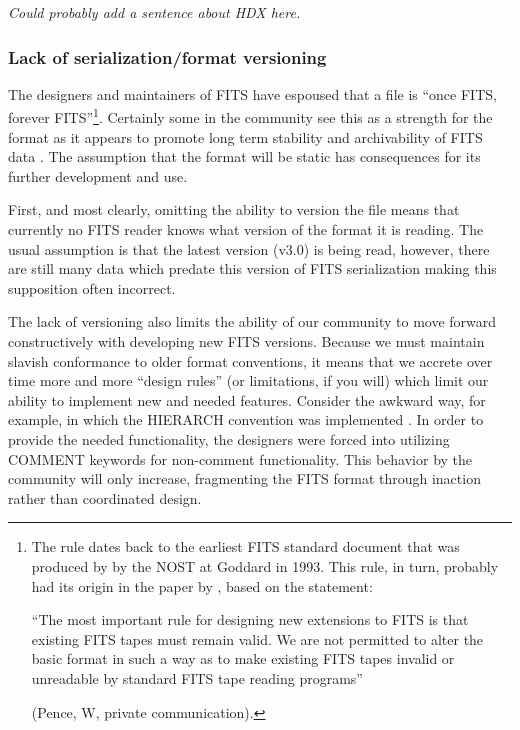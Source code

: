 \documentclass[final,authoryear,5p,times,twocolumn]{elsarticle}
\begin{document}
\textit{Could probably add a sentence about HDX here.}

\subsubsection{Lack of serialization/format versioning}


The designers and maintainers of FITS have espoused that a file is
``once FITS, forever FITS''\footnote{The rule dates back to the earliest
FITS standard document that was produced by by the NOST at Goddard in
1993. This rule, in turn, probably had its origin in the paper by
\citet{1988A&AS...73..359G}, based on the statement:

``The most important rule for designing new extensions to FITS is that
existing FITS tapes must remain valid.  We are not permitted to alter
the basic format in such a way as to make existing FITS tapes invalid
or unreadable by standard FITS tape reading programs''

(Pence, W, private communication).}.
Certainly some in the community see
this as a strength for the format as it appears to promote long term
stability and archivability of FITS data \citep[][US Library
of Congress\footnote{see \url{http://www.digitalpreservation.gov/formats/fdd/fdd000317.shtml}}]{2012EWASSAlle}.
The assumption that the format will be static has
consequences for its further development and use.


First, and most clearly, omitting the ability to version the file
means that currently no FITS reader knows what version of the format
it is reading. The usual assumption is that the latest version (v3.0)
is being read, however, there are still many data which predate this
version of FITS serialization making this supposition often incorrect.


The lack of versioning also limits the ability of our community to
move forward constructively with developing new FITS versions. Because
we must maintain slavish conformance to older format conventions, it
means that we accrete over time more and more ``design rules'' (or
limitations, if you will) which limit our ability to implement new and
needed features. Consider the awkward way, for example, in which the
HIERARCH convention was implemented \citep{2009Wic}.
In order to provide the needed functionality, the designers
were forced into utilizing COMMENT keywords for non-comment
functionality. This behavior by the community will only increase,
fragmenting the FITS format through inaction rather than coordinated
design.
\end{document}
